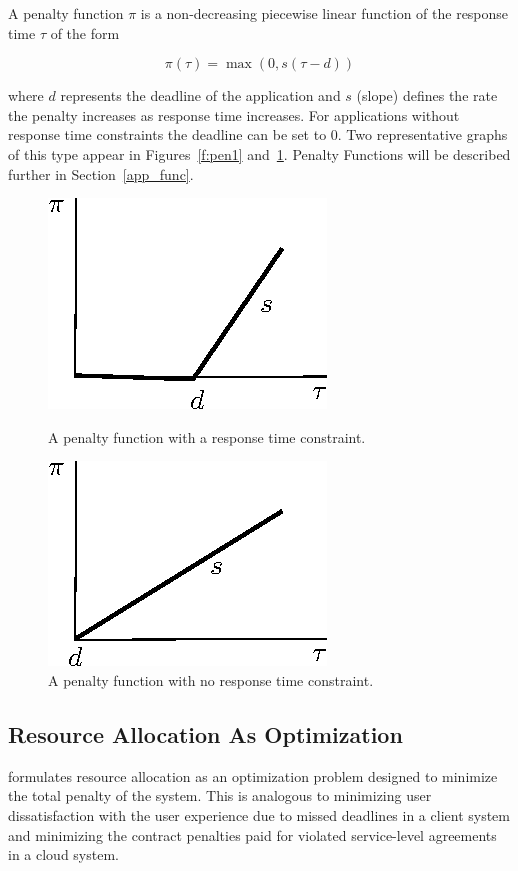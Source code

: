 A \pacora penalty function $\pi$ is a non-decreasing piecewise linear function of the response time $\tau$ of the form

\begin{equation}\label{pen_eq}
\pi(\tau) = \max(0, s(\tau - d))
\end{equation}

where $d$ represents the deadline of the application and $s$ (slope) defines the rate the penalty increases as response time increases. For applications without response time constraints the deadline can be set to $0$. Two representative graphs of this type appear in Figures~\ref{f:pen1} and~\ref{f:pen2}. Penalty Functions will be described further in Section~\ref{app_func}.

\begin{figure}[hb]
\parbox{1.6in}{
\includegraphics*{Penalty1.eps}
\caption{\label{f:pen1}A penalty function with a response time constraint.}
}
\hspace{\fill}
\parbox{1.6in}{
\includegraphics*{Penalty2.eps}
\caption{\label{f:pen2}A penalty function with no response time constraint.}
}
\end{figure}

\subsection*{Resource Allocation As Optimization}
\pacora formulates resource allocation as an optimization problem designed to minimize the total penalty of the system. This is analogous to minimizing user dissatisfaction with the user experience due to missed deadlines in a client system and minimizing the contract penalties paid for violated service-level agreements in a cloud system.

